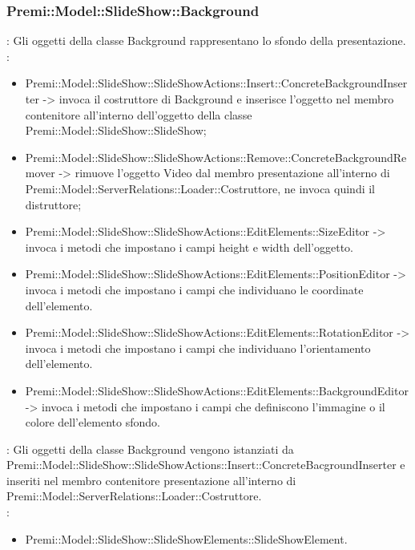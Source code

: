 {                 \subsubsection{Premi::Model::SlideShow::Background}{
                				\textbf{\tipo}: Gli oggetti della classe Background rappresentano lo sfondo della presentazione.\\
                				\textbf{\relaz}: 
                				\begin{itemize}
                					\item Premi::Model::SlideShow::SlideShowActions::Insert::ConcreteBackgroundInserter -> invoca il costruttore di Background e inserisce l’oggetto nel membro contenitore all’interno dell’oggetto della classe Premi::Model::SlideShow::SlideShow;
                                    \item Premi::Model::SlideShow::SlideShowActions::Remove::ConcreteBackgroundRemover -> rimuove l’oggetto Video dal membro presentazione all’interno di Premi::Model::ServerRelations::Loader::Costruttore, ne invoca quindi il distruttore;
                                    \item Premi::Model::SlideShow::SlideShowActions::EditElements::SizeEditor -> invoca i metodi che impostano i campi height e width dell'oggetto.
                    \item Premi::Model::SlideShow::SlideShowActions::EditElements::PositionEditor -> invoca i metodi che impostano i campi che individuano le coordinate dell'elemento.
                    \item Premi::Model::SlideShow::SlideShowActions::EditElements::RotationEditor -> invoca i metodi che impostano i campi che individuano l'orientamento dell'elemento.
                    \item Premi::Model::SlideShow::SlideShowActions::EditElements::BackgroundEditor -> invoca i metodi che impostano i campi che definiscono l'immagine o il colore dell'elemento sfondo.
                				\end{itemize}	
                                \textbf{\interfacce}: Gli oggetti della classe Background vengono istanziati da Premi::Model::SlideShow::SlideShowActions::Insert::ConcreteBacgroundInserter   e inseriti nel membro contenitore presentazione all’interno di Premi::Model::ServerRelations::Loader::Costruttore.\\
                                \textbf{\base}: 
                                    \begin{itemize}
                                    \item Premi::Model::SlideShow::SlideShowElements::SlideShowElement.
                                    \end{itemize}
                                    }              
}


